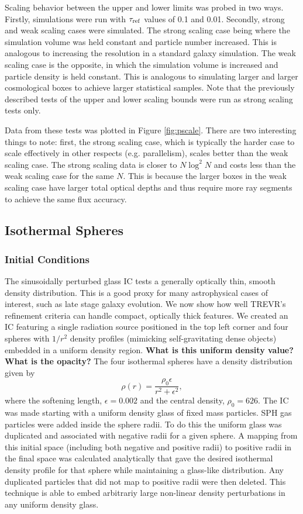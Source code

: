 \documentclass[fleq,usenatbib]{mnras}
\newcommand{\acro}{TREVR}
\newcommand{\comment}[1]{\textbf{\color{red}#1}}
\newcommand{\tr}{\tau_{\rm ref}}
\begin{document}
{Scaling behavior between the upper and lower limits was probed in two ways. 
Firstly, simulations were run with $\tr$ values of 0.1 and 0.01. Secondly, 
strong and weak scaling cases were simulated. The strong scaling case being 
where the simulation volume was held constant and particle number increased. 
This is analogous to increasing the resolution in a standard galaxy 
simulation. The weak scaling case is the opposite, in which the simulation 
volume is increased and particle density is held constant. This is analogous 
to simulating larger and larger cosmological boxes to achieve larger 
statistical samples. Note that the previously described tests of the upper and 
lower scaling bounds were run as strong scaling tests only.

Data from these tests was plotted in Figure \ref{fig:pscale}. 
There are two interesting things to note: first, the strong scaling case, 
which is typically the harder case to scale effectively in other respects (e.g. parallelism),
scales better than 
the weak scaling case.  The strong scaling data is closer to
$N\log^2{N}$ and costs less than the weak scaling case for the same $N$. This is 
because the larger boxes in the weak scaling case have larger total
optical depths and thus require more ray segments to achieve the same flux accuracy.

\subsection{Isothermal Spheres}\label{spheretest}
\subsubsection{Initial Conditions}
The sinusoidally perturbed glass IC tests a generally optically thin, smooth 
density distribution. This is a good proxy for many astrophysical cases of 
interest, such as late stage galaxy evolution.  We now show how well \acro{}'s 
refinement criteria can handle compact, optically thick features.   We created 
an IC featuring a single radiation source positioned in the top left corner 
and four spheres with $1/r^2$ density profiles (mimicking self-gravitating dense objects)
embedded in a uniform density region. \comment{What is this uniform density value?  What is the opacity?}
The four isothermal spheres have a 
density distribution given by
\begin{equation}
\rho(r) = \frac{\rho_0 \epsilon}{r^2 + \epsilon^2},
\end{equation}
where the softening length, $\epsilon=0.002$ and the central density, 
$\rho_0=626$.  The IC was made starting with a uniform density glass of fixed mass particles.
SPH gas particles were added inside the sphere radii.
To do this the uniform glass was duplicated and associated with negative radii for a given sphere.
A mapping from this initial space (including both negative and positive radii) to positive
radii in the final space was calculated analytically
that gave the desired isothermal density profile for that sphere
while maintaining a glass-like distribution.
Any duplicated particles that did not map to positive radii were then deleted.
This technique is able to embed arbitrariy large non-linear density
perturbations in any uniform density glass.

}
\end{document}
